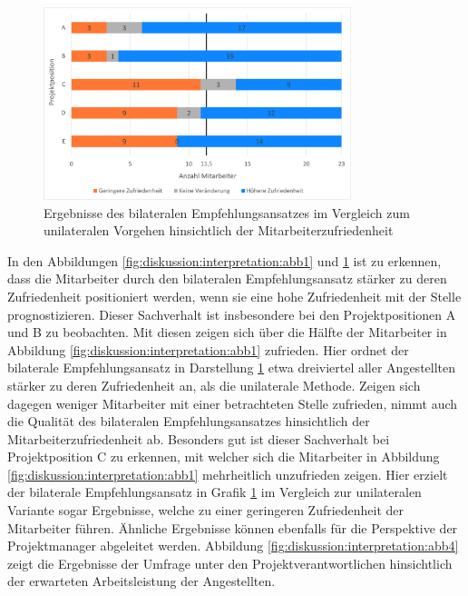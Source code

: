 \begin{figure}[h]
	\centering
	\includegraphics[width=0.8\textwidth]{gfx/zufriedenheit-projekte.png}	
	\caption{Ergebnisse des bilateralen Empfehlungsansatzes im Vergleich zum unilateralen Vorgehen hinsichtlich der Mitarbeiterzufriedenheit}
	\label{fig:diskussion:interpretation:abb3}
\end{figure}

In den Abbildungen \ref{fig:diskussion:interpretation:abb1} und \ref{fig:diskussion:interpretation:abb3} ist zu erkennen, dass die Mitarbeiter durch den bilateralen Empfehlungsansatz stärker zu deren Zufriedenheit positioniert werden, wenn sie eine hohe Zufriedenheit mit der Stelle prognostizieren. Dieser Sachverhalt ist insbesondere bei den Projektpositionen A und B zu beobachten. Mit diesen zeigen sich über die Hälfte der Mitarbeiter in Abbildung \ref{fig:diskussion:interpretation:abb1} zufrieden. Hier ordnet der bilaterale Empfehlungsansatz in Darstellung \ref{fig:diskussion:interpretation:abb3} etwa dreiviertel aller Angestellten stärker zu deren Zufriedenheit an, als die unilaterale Methode. Zeigen sich dagegen weniger Mitarbeiter mit einer betrachteten Stelle zufrieden, nimmt auch die Qualität des bilateralen Empfehlungsansatzes hinsichtlich der Mitarbeiterzufriedenheit ab. Besonders gut ist dieser Sachverhalt bei Projektposition C zu erkennen, mit welcher sich die Mitarbeiter in Abbildung \ref{fig:diskussion:interpretation:abb1} mehrheitlich unzufrieden zeigen. Hier erzielt der bilaterale Empfehlungsansatz in Grafik \ref{fig:diskussion:interpretation:abb3} im Vergleich zur unilateralen Variante sogar Ergebnisse, welche zu einer geringeren Zufriedenheit der Mitarbeiter führen. Ähnliche Ergebnisse können ebenfalls für die Perspektive der Projektmanager abgeleitet werden. Abbildung \ref{fig:diskussion:interpretation:abb4} zeigt die Ergebnisse der Umfrage unter den Projektverantwortlichen hinsichtlich der erwarteten Arbeitsleistung der Angestellten.

